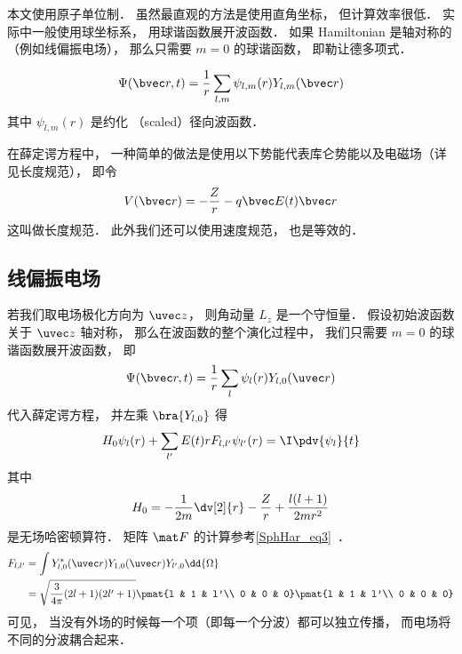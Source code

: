

本文使用原子单位制． 虽然最直观的方法是使用直角坐标， 但计算效率很低． 实际中一般使用球坐标系， 用球谐函数展开波函数． 如果 Hamiltonian 是轴对称的（例如线偏振电场）， 那么只需要 $m = 0$ 的球谐函数， 即勒让德多项式．

\begin{equation}
\Psi(\bvec r, t) = \frac{1}{r}\sum_{l,m} \psi_{l,m}(r) Y_{l,m}(\bvec r)
\end{equation}
其中 $\psi_{l,m}(r)$ 是约化 （scaled）径向波函数．

在薛定谔方程中， 一种简单的做法是使用以下势能代表库仑势能以及电磁场（详见长度规范）， 即令
\begin{equation}
V(\bvec r) = -\frac{Z}{r} - q\bvec E(t) \bvec r
\end{equation}
这叫做长度规范．%
此外我们还可以使用速度规范， 也是等效的．%

\subsection{线偏振电场}
若我们取电场极化方向为 $\uvec z$， 则角动量 $L_z$ 是一个守恒量． 假设初始波函数关于 $\uvec z$ 轴对称， 那么在波函数的整个演化过程中， 我们只需要 $m=0$ 的球谐函数展开波函数， 即
\begin{equation}
\Psi(\bvec r, t) = \frac{1}{r}\sum_{l} \psi_{l}(r) Y_{l, 0}(\uvec r)
\end{equation}
代入薛定谔方程， 并左乘 $\bra{Y_{l,0}}$ 得
\begin{equation}\label{HyTDSE_eq4}
H_0 \psi_{l}(r) + \sum_{l'} E(t)rF_{l, l'} \psi_{l'}(r) = \I \pdv{\psi_{l}}{t}
\end{equation}
其中
\begin{equation}
H_0 = -\frac{1}{2m} \dv[2]{r} -\frac{Z}{r} + \frac{l(l+1)}{2mr^2}
\end{equation}
是无场哈密顿算符． 矩阵 $\mat F$ 的计算参考\autoref{SphHar_eq3}~．
\begin{equation}
\begin{aligned}
F_{l,l'} &= \int Y_{l,0}^*(\uvec r) Y_{1,0}(\uvec r) Y_{l',0} \dd{\Omega}\\
&= \sqrt{\frac{3}{4\pi} (2l+1)(2l'+1)} \pmat{l & 1 & l'\\ 0 & 0 & 0}\pmat{l & 1 & l'\\ 0 & 0 & 0}
\end{aligned}
\end{equation}
可见， 当没有外场的时候每一个项（即每一个分波）都可以独立传播， 而电场将不同的分波耦合起来．

